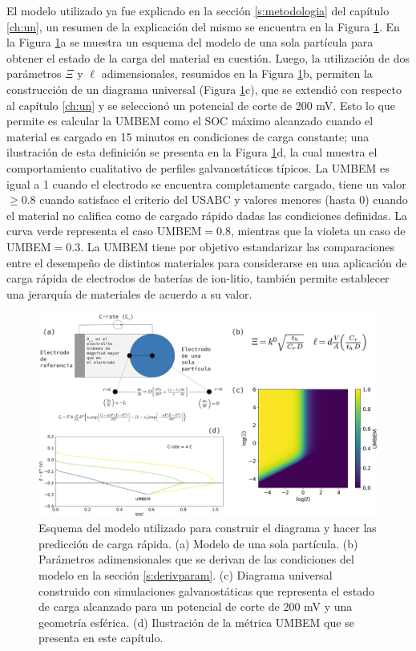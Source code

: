 El modelo utilizado ya fue explicado en la sección \ref{s:metodologia} del
capítulo \ref{ch:un}, un resumen de la explicación del mismo se encuentra 
en la Figura \ref{fig:explicacion}. En la Figura \ref{fig:explicacion}a se 
muestra un esquema del modelo de una sola partícula para obtener el estado
de la carga del material en cuestión. Luego, la utilización de dos parámetros
$\Xi$ y $\ell$ adimensionales, resumidos en la Figura \ref{fig:explicacion}b,
permiten la construcción de un diagrama universal (Figura 
\ref{fig:explicacion}c), que se extendió con respecto al capítulo \ref{ch:un}
y se seleccionó un potencial de corte de 200 mV. Esto lo que permite es 
calcular la UMBEM como el SOC máximo alcanzado cuando el material es cargado
en 15 minutos en condiciones de carga constante; una ilustración de esta 
definición se presenta en la Figura \ref{fig:explicacion}d, la cual muestra 
el comportamiento cualitativo de perfiles galvanostáticos típicos. La UMBEM
es igual a 1 cuando el electrodo se encuentra completamente cargado, tiene
un valor $\geq 0.8$ cuando satisface el criterio del USABC \cite{USABC} y
valores menores (hasta 0) cuando el material no califica como de cargado 
rápido dadas las condiciones definidas. La curva verde representa el caso 
UMBEM$ = 0.8$, mientras que la violeta un caso de UMBEM$ = 0.3$. La UMBEM 
tiene por objetivo estandarizar las comparaciones entre el desempeño de distintos 
materiales para considerarse en una aplicación de carga rápida de electrodos
de baterías de ion-litio, también permite establecer una jerarquía de 
materiales de acuerdo a su valor.
\begin{figure}[h!]
    \centering
    \includegraphics[width=\textwidth]{FastCharging/umbem/explicacion/explicacion.png}
    \caption{Esquema del modelo utilizado para construir el diagrama y hacer 
    las predicción de carga rápida. (a) Modelo de una sola partícula. (b) 
    Parámetros adimensionales que se derivan de las condiciones del modelo 
    en la sección \ref{s:derivparam}. (c) Diagrama universal construido con 
    simulaciones galvanostáticas que representa el estado de carga alcanzado para 
    un potencial de corte de 200 mV y una geometría esférica. (d) Ilustración
    de la métrica UMBEM que se presenta en este capítulo.}
    \label{fig:explicacion}
\end{figure}

